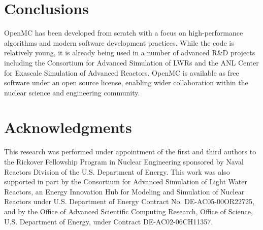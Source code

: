 \documentclass{snamc2013}
\begin{document}
\section{Conclusions}

OpenMC has been developed from scratch with a focus on high-performance
algorithms and modern software development practices. While the code is
relatively young, it is already being used in a number of advanced R\&D projects
including the Consortium for Advanced Simulation of LWRs and the ANL Center for
Exascale Simulation of Advanced Reactors. OpenMC is available as free software
under an open source license, enabling wider collaboration within the nuclear
science and engineering community.

\section*{Acknowledgments}

This research was performed under appointment of the first and third authors to
the Rickover Fellowship Program in Nuclear Engineering sponsored by Naval
Reactors Division of the U.S. Department of Energy. This work was also supported
in part by the Consortium for Advanced Simulation of Light Water Reactors, an
Energy Innovation Hub for Modeling and Simulation of Nuclear Reactors under
U.S. Department of Energy Contract No. DE-AC05-00OR22725, and by the Office of
Advanced Scientific Computing Research, Office of Science, U.S. Department of
Energy, under Contract DE-AC02-06CH11357.



\end{document}
